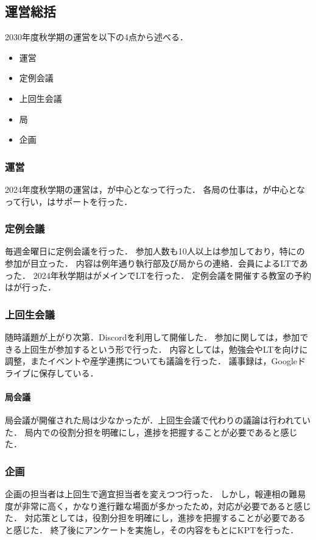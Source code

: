 \subsection*{運営総括}


2030年度秋学期の運営を以下の4点から述べる．
\begin{itemize}
    \item 運営
    \item 定例会議
    \item 上回生会議
    \item 局
    \item 企画
\end{itemize}

\subsubsection*{運営}
2024年度秋学期の運営は，\thirdGrade{}が中心となって行った．
各局の仕事は\firstGrade{}，\secondGrade{}が中心となって行い，\thirdGrade{}はサポートを行った．

\subsubsection*{定例会議}
毎週金曜日に定例会議を行った．
参加人数も10人以上は参加しており，特に\firstGrade{}の参加が目立った．
内容は例年通り執行部及び局からの連絡．会員によるLTであった．
2024年秋学期は\firstGrade{}がメインでLTを行った．
定例会議を開催する教室の予約は\kensuiChief{}が行った．

\subsubsection*{上回生会議}
随時議題が上がり次第．Discordを利用して開催した．
参加に関しては，参加できる上回生が参加するという形で行った．
内容としては，勉強会やLTを\firstGrade{}向けに調整，またイベントや産学連携についても議論を行った．
議事録は，Googleドライブに保存している．

\paragraph*{局会議}
局会議が開催された局は少なかったが．上回生会議で代わりの議論は行われていた．
局内での役割分担を明確にし，進捗を把握することが必要であると感じた．

\subsubsection*{企画}
企画の担当者は上回生で適宜担当者を変えつつ行った．
しかし，報連相の難易度が非常に高く，かなり進行難な場面が多かったため，対応が必要であると感じた．
対応策としては，役割分担を明確にし，進捗を把握することが必要であると感じた．
終了後にアンケートを実施し，その内容をもとにKPTを行った．

